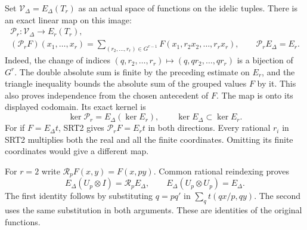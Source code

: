 Set $\mathcal V_\Delta=E_\Delta(T_r)$ as an actual space of functions
on the idelic tuples. There is an exact linear map on this image:
\begin{equation}\tag{SRT2}
\begin{gathered}
\mathcal P_r:\mathcal V_\Delta\longrightarrow E_r(T_r),\\
(\mathcal P_rF)(x_1,\ldots,x_r)=
 \sum_{(r_2,\ldots,r_r)\in G^{r-1}}
       F(x_1,r_2x_2,\ldots,r_rx_r),\qquad
\mathcal P_rE_\Delta=E_r.
\end{gathered}
\end{equation}
Indeed, the change of indices
$(q,r_2,\ldots,r_r)\mapsto(q,qr_2,\ldots,qr_r)$ is a bijection of
$G^r$. The double absolute sum is finite by the preceding estimate on
$E_r$, and the triangle inequality bounds the absolute sum of the
grouped values $F$ by it. This also proves independence from the chosen
antecedent of $F$. The map is onto its displayed codomain. Its exact
kernel is
\begin{equation}\tag{SRT3}
\ker\mathcal P_r=E_\Delta(\ker E_r),\qquad
\ker E_\Delta\subset\ker E_r.
\end{equation}
For if $F=E_\Delta t$, SRT2 gives $\mathcal P_rF=E_rt$ in both
directions. Every rational $r_i$ in SRT2 multiplies both the real and
all the finite coordinates. Omitting its finite coordinates would give
a different map.

For $r=2$ write $\mathcal R_pF(x,y)=F(x,py)$.
Common rational reindexing proves
\begin{equation}\tag{SRT4}
E_\Delta(U_p\otimes I)=\mathcal R_pE_\Delta,\qquad
E_\Delta(U_p\otimes U_p)=E_\Delta.
\end{equation}
The first identity follows by substituting $q=pq'$ in
$\sum_qt(qx/p,qy)$. The second uses the same substitution in both
arguments. These are identities of the original functions.

